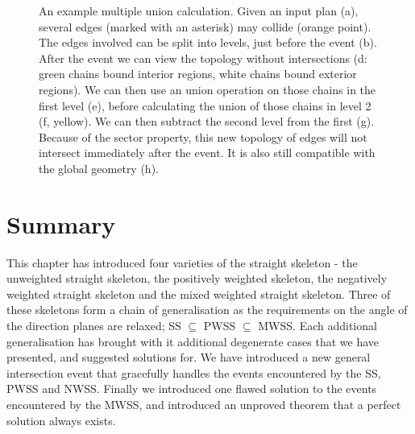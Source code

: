 \begin{figure}
  \centering
  \def\svgwidth{1.0\columnwidth}
  
  \caption[A multiple union calculation]{\label{fig:wss_gie_example} An example multiple union calculation. Given an input plan (a), several edges (marked with an asterisk) may collide (orange point). The edges involved can be split into levels, just before the event (b). After the event we can view the topology without intersections (d: green chains bound interior regions, white chains bound exterior regions). We can then use an union operation on those chains in the first level (e), before calculating the union of those chains in level 2 (f, yellow). We can then subtract the second level from the first (g). Because of the sector property, this new topology of edges will not intersect immediately after the event. It is also still compatible with the global geometry (h).}
\end{figure}

\FloatBarrier
\section{Summary}

This chapter has introduced four varieties of the straight skeleton - the unweighted straight skeleton, the positively weighted skeleton, the negatively weighted straight skeleton and the mixed weighted straight skeleton. Three of these skeletons form a chain of generalisation as the requirements on the angle of the direction planes are relaxed; SS $\subseteq$ PWSS $\subseteq$ MWSS. Each additional generalisation has brought with it additional degenerate cases that we have presented, and suggested solutions for. We have introduced a new general intersection event that gracefully handles the events encountered by the SS, PWSS and NWSS. Finally we introduced one flawed solution to the events encountered by the MWSS, and introduced an unproved theorem that a perfect solution always exists.



